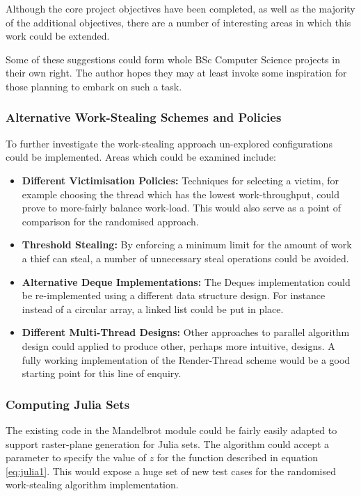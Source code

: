 Although the core project objectives have been completed, as well as the majority of the additional objectives, 
there are a number of interesting areas in which this work could be extended.

Some of these suggestions could form whole BSc Computer Science projects in their own right. The author hopes they 
may at least invoke some inspiration for those planning to embark on such a task.

\subsubsection*{Alternative Work-Stealing Schemes and Policies}
To further investigate the work-stealing approach un-explored configurations could be implemented. 
Areas which could be examined include:
\begin{itemize}
\item \textbf{Different Victimisation Policies: } 
    Techniques for selecting a victim, for example choosing the thread which has the lowest work-throughput, could 
    prove to more-fairly balance work-load. This would also serve as a point of comparison for the randomised approach.
\item \textbf{Threshold Stealing: }
    By enforcing a minimum limit for the amount of work a thief can steal, a number of unnecessary steal operations could be avoided.
\item \textbf{Alternative Deque Implementations: }
    The Deques implementation could be re-implemented using a different data structure design. For instance instead of a circular array,
    a linked list could be put in place.
\item \textbf{Different Multi-Thread Designs: }
    Other approaches to parallel algorithm design could applied to produce other, perhaps more intuitive, designs.
    A fully working implementation of the Render-Thread scheme would be a good starting point for this line of enquiry.
\end{itemize}

\subsubsection*{Computing Julia Sets}
The existing code in the Mandelbrot module could be fairly easily adapted to support raster-plane generation for Julia sets.
The algorithm could accept a parameter to specify the value of \(z\) for the function described in equation \ref{eq:julia1}.
This would expose a huge set of new test cases for the randomised work-stealing algorithm implementation.

